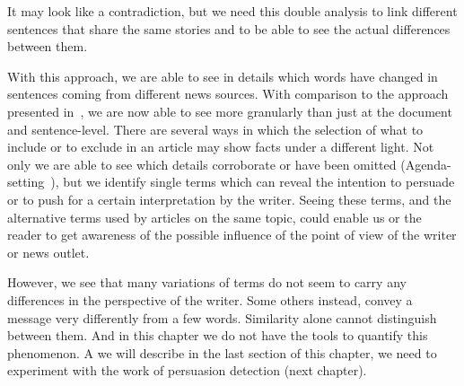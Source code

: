 It may look like a contradiction, but we need this double analysis to link different sentences that share the same stories and to be able to see the actual differences between them.

With this approach, we are able to see in details which words have changed in sentences coming from different news sources.
With comparison to the approach presented in~\citet{bountouridis2018explaining}, we are now able to see more granularly than just at the document and sentence-level.
There are several ways in which the selection of what to include or to exclude in an article may show facts under a different light. Not only we are able to see which details corroborate or have been omitted (Agenda-setting~\citep{Cohen_1964}), but we identify single terms which can reveal the intention to persuade or to push for a certain interpretation by the writer. Seeing these terms, and the alternative terms used by articles on the same topic, could enable us or the reader to get awareness of the possible influence of the point of view of the writer or news outlet.

However, we see that many variations of terms do not seem to carry any differences in the perspective of the writer. Some others instead, convey a message very differently from a few words. Similarity alone cannot distinguish between them. And in this chapter we do not have the tools to quantify this phenomenon. A we will describe in the last section of this chapter, we need to experiment with the work of persuasion detection (next chapter).




